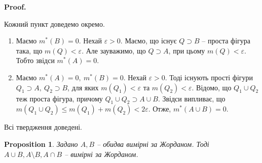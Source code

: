 \documentclass[a4paper, 10pt]{article}
\makeatletter
\def\qed{$\blacksquare$}
\theoremstyle{theoremdd}
\theoremstyle{theoremdd}
\theoremstyle{theoremdd}
\theoremstyle{theoremdd}
\theoremstyle{theoremdd}
\theoremstyle{theoremdd}
\theoremstyle{theoremdd}
\theoremstyle{theoremdd}
\theoremstyle{theoremdd}
\newtheorem{proposition}[theorem]{Proposition}
\theoremstyle{theoremdd}
\theoremstyle{theoremdd}
\theoremstyle{theoremdd}
\theoremstyle{theoremdd}
\theoremstyle{theoremdd}
\theoremstyle{theoremdd}
\renewenvironment{proof}[1][Proof.\\]{\par
\pushQED{\hfill \qed}%
\normalfont \topsep6\p@\@plus6\p@\relax
\trivlist
\item\relax
{\bfseries
#1\@addpunct{.}}\hspace\labelsep\ignorespaces
}{%
\popQED\endtrivlist\@endpefalse
}
\makeatother
\begin{document}
\begin{proof}
Кожний пункт доведемо окремо.
\begin{enumerate}[wide=0pt,label={\arabic*)}]
\item Маємо $m^*(B) = 0$. Нехай $\varepsilon > 0$. Маємо, що існує $Q \supset B$ -- проста фігура така, що $m(Q) < \varepsilon$. Але зауважимо, що $Q \supset A$, при цьому $m(Q) < \varepsilon$. Тобто звідси $m^*(A) = 0$.
\item Маємо $m^*(A) = 0,\ m^*(B) = 0$. Нехай $\varepsilon > 0$. Тоді існують прості фігури $Q_1 \supset A,\ Q_2 \supset B$, для яких $m(Q_1) < \varepsilon$ та $m(Q_2) < \varepsilon$. Відомо, що $Q_1 \cup Q_2$ теж проста фігура, причому $Q_1 \cup Q_2 \supset A \cup B$. Звідси випливає, що $m(Q_1 \cup Q_2) \leq m(Q_1) + m(Q_2) < 2\varepsilon$. Отже, $m^*(A \cup B) = 0$.
\end{enumerate}
Всі твердження доведені.
\end{proof}

\begin{proposition}
Задано $A,B$ -- обидва вимірні за Жорданом. Тоді $A \cup B, A \setminus B, A \cap B$ -- вимірні за Жорданом.
\end{proposition}
\end{document}
